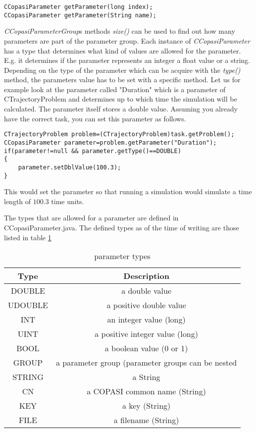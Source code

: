 \documentclass[a4,10pt]{article}
\begin{document}
\begin{lstlisting}
CCopasiParameter getParameter(long index);
CCopasiParameter getParameter(String name);
\end{lstlisting}

\textit{CCopasiParameterGroup}s methods \textit{size()} can be used to find out how many parameters are part of the parameter group.
Each instance of \textit{CCopasiParameter} has a type that determines what kind of values are allowed for the parameter. E.g. it determines if the parameter represents an integer a float value or a string.
Depending on the type of the parameter which can be acquire with the \textit{type()} method, the parameters value has to be set with a specific method.
Let us for example look at the parameter called "Duration" which is a parameter of CTrajectoryProblem and determines up to which time the simulation will be calculated. The parameter itself stores a double value. Assuming you already have the correct task, you can set this parameter as follows.    

\begin{lstlisting}
CTrajectoryProblem problem=(CTrajectoryProblem)task.getProblem();
CCopasiParameter parameter=problem.getParameter("Duration");
if(parameter!=null && parameter.getType()==DOUBLE)
{
    parameter.setDblValue(100.3);
}
\end{lstlisting}

This would set the parameter so that running a simulation would simulate a time length of $100.3$ time units. 

The types that are allowed for a parameter are defined in CCopasiParameter.java. The defined types as of the time of writing are those listed in table \ref{ParameterTypes}

\begin{table}[ht]
\begin{tabular}{ c | c }
\hline
Type & Description \\ \hline \hline
DOUBLE &  a double value \\ \hline
UDOUBLE & a positive double value \\ \hline 
INT & an integer value (long) \\ \hline 
UINT & a positive integer value (long) \\ \hline 
BOOL & a boolean value (0 or 1) \\ \hline 
GROUP & a parameter group (parameter groups can be nested \\ \hline 
STRING & a String \\ \hline
CN & a COPASI common name (String) \\ \hline
KEY & a key (String) \\ \hline
FILE & a filename (String) \\ \hline
\end{tabular}
\label{ParameterTypes}
\caption{parameter types}
\end{table}
\end{document}
